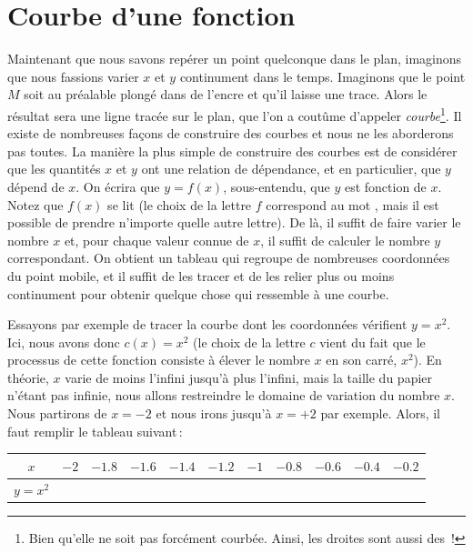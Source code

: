 	\section{Courbe d'une fonction}
		Maintenant que nous savons repérer un point quelconque dans le plan, imaginons que nous fassions varier $x$ et $y$ continument dans le temps. Imaginons que le point $M$ soit au préalable plongé dans de l'encre et qu'il laisse une trace. Alors le résultat sera une ligne tracée sur le plan, que l'on a coutûme d'appeler \emph{courbe}\footnote{Bien qu'elle ne soit pas forcément courbée. Ainsi, les droites sont aussi des \,!}. Il existe de nombreuses façons de construire des courbes et nous ne les aborderons pas toutes. La manière la plus simple de construire des courbes est de considérer que les quantités $x$ et $y$ ont une relation de dépendance, et en particulier, que $y$ dépend de $x$. On écrira que $y=f(x)$, sous-entendu, que $y$ est fonction de $x$. Notez que $f(x)$ se lit  (le choix de la lettre $f$ correspond au mot , mais il est possible de prendre n'importe quelle autre lettre). De là, il suffit de faire varier le nombre $x$ et, pour chaque valeur connue de $x$, il suffit de calculer le nombre $y$ correspondant. On obtient un tableau qui regroupe de nombreuses coordonnées du point mobile, et il suffit de les tracer et de les relier plus ou moins continument pour obtenir quelque chose qui ressemble à une courbe.

		Essayons par exemple de tracer la courbe dont les coordonnées vérifient $y=x^2$. Ici, nous avons donc $c(x)=x^2$ (le choix de la lettre $c$ vient du fait que le processus de cette fonction consiste à élever le nombre $x$ en son carré, $x^2$). En théorie, $x$ varie de moins l'infini jusqu'à plus l'infini, mais la taille du papier n'étant pas infinie, nous allons restreindre le domaine de variation du nombre $x$. Nous partirons de $x=-2$ et nous irons jusqu'à $x=+2$ par exemple. Alors, il faut remplir le tableau suivant\,:

		\begin{tabular}{|c|c|c|c|c|c|c|c|c|c|c|}
			\hline
			$x$     &$  -2 $&$ -1.8 $&$ -1.6 $&$ -1.4 $&$ -1.2 $&$ -1 $&$ -0.8 $&$ -0.6 $&$ -0.4 $&$ -0.2 $\\
			\hline
			$y=x^2$ &       &         &       &        &        &      &         &       &         &        \\
			\hline
		\end{tabular}

		\vspace{0.3cm}

